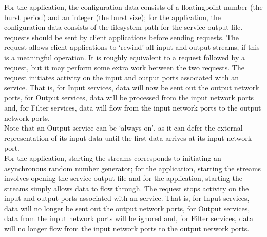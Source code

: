 For the  application, the
configuration data consists of a floating\longDash{}point number (the burst period) and an
integer (the burst size); for the 
application, the configuration data consists of the file\longDash{}system path for the
service output file.\\

 requests should be sent by
client applications before sending
 requests.
The  request allows client
applications to `rewind' all input and output streams, if this is a meaningful operation.
It is roughly equivalent to a 
request followed by a  request,
but it may perform some extra work between the two requests.
The  request initiates activity
on the input and output ports associated with an  service.
That is, for Input services, data will now be sent out the output \yarp{} network ports,
for Output services, data will be processed from the input \yarp{} network ports and, for
Filter services, data will flow from the input \yarp{} network ports to the output \yarp{}
network ports.\\

Note that an Output service can be `always on', as it can defer the external
representation of its input data until the first data arrives at its input \yarp{}
network port.\\

For the  application, starting the
streams corresponds to initiating an asynchronous random number generator; for the
 application, starting the streams
involves opening the service output file and for the
 application, starting the streams
simply allows data to flow through.
The  request stops activity on
the input and output ports associated with an  service.
That is, for Input services, data will no longer be sent out the output \yarp{} network
ports, for Output services, data from the input \yarp{} network ports will be ignored and,
for Filter services, data will no longer flow from the input \yarp{} network ports to the
output \yarp{} network ports.\\

